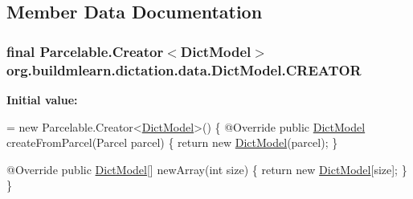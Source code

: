 \subsection{Member Data Documentation}
\subsubsection[{\texorpdfstring{C\+R\+E\+A\+T\+OR}{CREATOR}}]{\setlength{\rightskip}{0pt plus 5cm}final Parcelable.\+Creator$<${\bf Dict\+Model}$>$ org.\+buildmlearn.\+dictation.\+data.\+Dict\+Model.\+C\+R\+E\+A\+T\+OR}\hypertarget{classorg_1_1buildmlearn_1_1dictation_1_1data_1_1DictModel_a824a308a5003ec6a93b6f1a89f393267}{}\label{classorg_1_1buildmlearn_1_1dictation_1_1data_1_1DictModel_a824a308a5003ec6a93b6f1a89f393267}
{\bfseries Initial value\+:}
\begin{DoxyCode}
= \textcolor{keyword}{new} Parcelable.Creator<\hyperlink{classorg_1_1buildmlearn_1_1dictation_1_1data_1_1DictModel_a6d125a46e3f968eab7e28fbe3305bd3c}{DictModel}>() \{
        @Override
        \textcolor{keyword}{public} \hyperlink{classorg_1_1buildmlearn_1_1dictation_1_1data_1_1DictModel_a6d125a46e3f968eab7e28fbe3305bd3c}{DictModel} createFromParcel(Parcel parcel) \{
            \textcolor{keywordflow}{return} \textcolor{keyword}{new} \hyperlink{classorg_1_1buildmlearn_1_1dictation_1_1data_1_1DictModel_a6d125a46e3f968eab7e28fbe3305bd3c}{DictModel}(parcel);
        \}

        @Override
        \textcolor{keyword}{public} \hyperlink{classorg_1_1buildmlearn_1_1dictation_1_1data_1_1DictModel_a6d125a46e3f968eab7e28fbe3305bd3c}{DictModel}[] newArray(\textcolor{keywordtype}{int} size) \{
            \textcolor{keywordflow}{return} \textcolor{keyword}{new} \hyperlink{classorg_1_1buildmlearn_1_1dictation_1_1data_1_1DictModel_a6d125a46e3f968eab7e28fbe3305bd3c}{DictModel}[size];
        \}
    \}
\end{DoxyCode}
